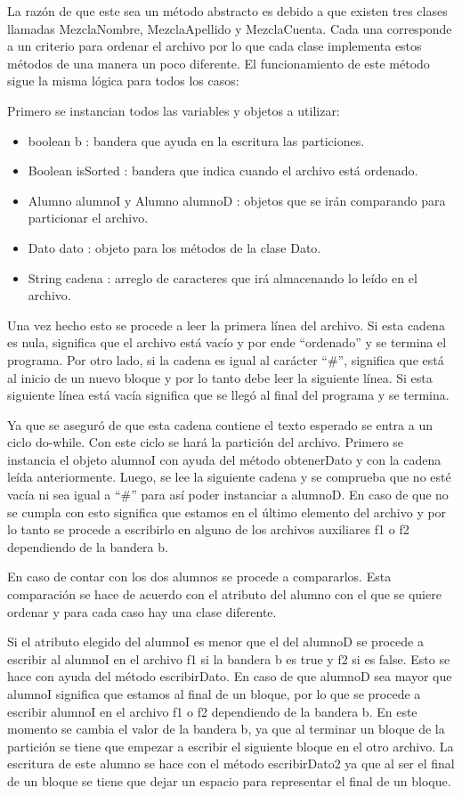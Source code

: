 \documentclass[11pt]{article}
\begin{document}
\begin{itemize}
\par 
La razón de que este sea un método abstracto es debido a que existen tres clases llamadas MezclaNombre, MezclaApellido y MezclaCuenta. Cada una corresponde a un criterio para ordenar el archivo por lo que cada clase implementa estos métodos de una manera un poco diferente. El funcionamiento de este método sigue la misma lógica para todos los casos:
\par 
Primero se instancian todos las variables y objetos a utilizar:
\begin{itemize}
\item boolean b : bandera que ayuda en la escritura las particiones.
\item Boolean isSorted : bandera que indica cuando el archivo está ordenado.
\item Alumno alumnoI y Alumno alumnoD : objetos que se irán comparando para particionar el archivo.
\item Dato dato : objeto para los métodos de la clase Dato.
\item String cadena : arreglo de caracteres que irá almacenando lo leído en el archivo.
\end{itemize}
Una vez hecho esto se procede a leer la primera línea del archivo. Si esta cadena es nula, significa que el archivo está vacío y por ende “ordenado” y se termina el programa. Por otro lado, si la cadena es igual al carácter “\#”, significa que está al inicio de un nuevo bloque y por lo tanto debe leer la siguiente línea. Si esta siguiente línea está vacía significa que se llegó al final del programa y se termina.
\par
Ya que se aseguró de que esta cadena contiene el texto esperado se entra a un ciclo do-while. Con este ciclo se hará la partición del archivo. Primero se instancia el objeto alumnoI con ayuda del método obtenerDato y con la cadena leída anteriormente. Luego, se lee la siguiente cadena y se comprueba que no esté vacía ni sea igual a “\#” para así poder instanciar a alumnoD. En caso de que no se cumpla con esto significa que estamos en el último elemento del archivo y por lo tanto se procede a escribirlo en alguno de los archivos auxiliares f1 o f2 dependiendo de la bandera b.
\par 
En caso de contar con los dos alumnos se procede a compararlos. Esta comparación se hace de acuerdo con el atributo del alumno con el que se quiere ordenar y para cada caso hay una clase diferente. 
\par 
Si el atributo elegido del alumnoI es menor que el del alumnoD se procede a escribir al alumnoI en el archivo f1 si la bandera b es true y f2 si es false. Esto se hace con ayuda del método escribirDato. En caso de que alumnoD sea mayor que alumnoI significa que estamos al final de un bloque, por lo que se procede a escribir alumnoI en el archivo f1 o f2 dependiendo de la bandera b. En este momento se cambia el valor de la bandera b, ya que al terminar un bloque de la partición se tiene que empezar a escribir el siguiente bloque en el otro archivo.  La escritura de este alumno se hace con el método escribirDato2 ya que al ser el final de un bloque se tiene que dejar un espacio para representar el final de un bloque.

\end{itemize}
\end{document}
